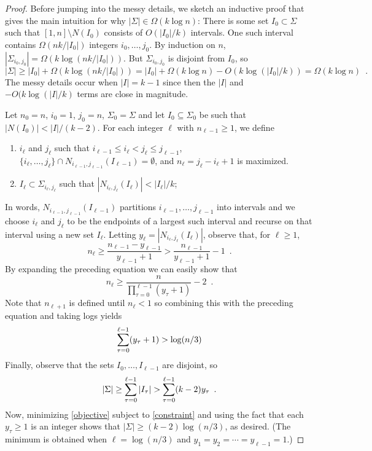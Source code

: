\documentclass{patmorin}
\begin{document}
\begin{proof}
   Before jumping into the messy details, we sketch an inductive proof
   that gives the main intuition for why $|\Sigma|\in \Omega(k\log n)$:
   There is some set $I_0\subset\Sigma$ such that $[1,n]\setminus N(I_0)$ consists of $O(|I_0|/k)$ intervals.  One such interval
   contains $\Omega(nk/|I_0|)$ integers $i_0,\ldots,j_0$.  By induction on $n$,
   $|\Sigma_{i_0,j_0}| = \Omega(k\log (nk/|I_0|))$.  But $\Sigma_{i_0,j_0}$
   is disjoint from $I_0$, so 
   \[  |\Sigma| \ge |I_0| + \Omega(k\log (nk/|I_0|))
        = |I_0| + \Omega(k\log n) - O(k\log(|I_0|/k))
        = \Omega(k\log n) \enspace .
   \]
   The messy details occur when $|I|=k-1$ since then the $|I|$ and
   $-O(k\log(|I|/k)$ terms are close in magnitude.

   Let $n_0=n$, $i_0=1$, $j_0=n$, $\Sigma_0=\Sigma$ and let
   $I_0\subseteq\Sigma_0$ be such that $|N(I_0)| < |I|/(k-2)$.
   For each integer $\ell$ with $n_{\ell-1}\ge 1$, we define 
   \begin{enumerate}
     \item $i_\ell$ and $j_\ell$ such that 
       $i_{\ell-1}\le i_\ell < j_\ell\le j_{\ell-1}$, 
       $\{i_\ell,\ldots,j_\ell\}\cap N_{i_{\ell-1},j_{\ell-1}}(I_{\ell-1})=\emptyset$, 
       and $n_\ell=j_\ell-i_\ell+1$ is maximized.
     \item $I_\ell\subset\Sigma_{i_\ell,j_\ell}$ such that
      $|N_{i_\ell,j_\ell}(I_\ell)| < |I_\ell|/k$;
   \end{enumerate}
   In words, $N_{i_{\ell-1},j_{\ell-1}}(I_{\ell-1})$ partitions $i_{\ell-1},\ldots,j_{\ell-1}$
   into intervals and we choose $i_\ell$ and $j_\ell$ to be the endpoints
   of a largest such interval and recurse on that interval using a new
   set $I_\ell$. Letting $y_\ell=|N_{i_\ell,j_\ell}(I_\ell)|$, observe that, for $\ell \ge 1$,
   \[
        n_\ell \ge \frac{n_{\ell-1}-y_{\ell-1}}{y_{\ell-1}+1}
               > \frac{n_{\ell-1}}{y_{\ell-1}+1} - 1 \enspace .
   \]
   By expanding the preceding equation we can easily show that
   \[
           n_{\ell} \ge \frac{n}{\prod_{\tau=0}^{\ell-1}(y_\tau+1)} - 2 \enspace .
   \]
   Note that $n_{\ell+1}$ is defined until $n_{\ell} < 1$ so combining this
   with the preceding equation and taking logs yields
   \begin{equation}
           \sum_{\tau=0}^{\ell-1}(y_\tau+1) > \log(n/3) \eqlabel{constraint}
   \end{equation}
   Finally, observe that the sets $I_0,\ldots,I_{\ell-1}$ are disjoint, so
   \begin{equation}
          |\Sigma| \ge \sum_{\tau=0}^{\ell-1} |I_\tau| >
             \sum_{\tau=0}^{\ell-1} (k-2)y_\tau \enspace . \eqlabel{objective}
   \end{equation}
   Now, minimizing \eqref{objective} subject to \eqref{constraint} and using
   the fact that each $y_\tau \ge 1$ is an integer shows that
   $|\Sigma|\ge (k-2)\log (n/3)$, as desired.  (The minimum is obtained when
   $\ell=\log(n/3)$ and $y_1=y_2=\cdots=y_{\ell-1}=1$.)
\end{proof}
\end{document}
